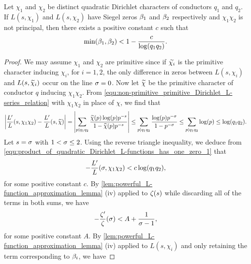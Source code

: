     \begin{proposition}\label{prop:product_of_quadratic_Dirichlet_L-functions_has_one_zero}
      Let $\chi_{1}$ and $\chi_{2}$ be distinct quadratic Dirichlet characters of conductors $q_{1}$ and $q_{2}$. If $L(s,\chi_{1})$ and $L(s,\chi_{2})$ have Siegel zeros $\beta_{1}$ and $\beta_{2}$ respectively and $\chi_{1}\chi_{2}$ is not principal, then there exists a positive constant $c$ such that
      \[
        \min(\beta_{1},\beta_{2}) < 1-\frac{c}{\log(q_{1}q_{2})}.
      \]
    \end{proposition}
    \begin{proof}
        We may assume $\chi_{1}$ and $\chi_{2}$ are primitive since if $\widetilde{\chi_{i}}$ is the primitive character inducing $\chi_{i}$, for $i = 1,2$, the only difference in zeros between $L(s,\chi_{i})$ and $L(s,\widetilde{\chi}_{i})$ occur on the line $\sigma = 0$. Now let $\widetilde{\chi}$ be the primitive character of conductor $q$ inducing $\chi_{1}\chi_{2}$. From \cref{equ:non-primitive_primitive_Dirichlet_L-series_relation} with $\chi_{1}\chi_{2}$ in place of $\chi$, we find that
        \begin{equation}\label{equ:product_of_quadratic_Dirichlet_L-functions_has_one_zero_1}
          \left|\frac{L'}{L}(s,\chi_{1}\chi_{2})-\frac{L'}{L}(s,\widetilde{\chi})\right| = \left|\sum_{p \mid q_{1}q_{2}}\frac{\widetilde{\chi}(p)\log(p)p^{-s}}{1-\widetilde{\chi}(p)p^{-s}}\right| \le \sum_{p \mid q_{1}q_{2}}\frac{\log(p)p^{-\sigma}}{1-p^{-\sigma}} \le \sum_{p \mid q_{1}q_{2}}\log(p) \le \log(q_{1}q_{2}).
        \end{equation}
        Let $s = \sigma$ with $1 < \sigma \le 2$. Using the reverse triangle inequality, we deduce from \cref{equ:product_of_quadratic_Dirichlet_L-functions_has_one_zero_1} that
        \begin{equation}\label{equ:product_of_quadratic_Dirichlet_L-functions_has_one_zero_2}
          -\frac{L'}{L}(\sigma,\chi_{1}\chi_{2}) < c\log(q_{1}q_{2}),
        \end{equation}
        for some positive constant $c$.
        By \cref{lem:powerful_L-function_approximation_lemma} (iv) applied to $\zeta(s)$ while discarding all of the terms in both sums, we have
        \begin{equation}\label{equ:product_of_quadratic_Dirichlet_L-functions_has_one_zero_3}
          -\frac{\zeta'}{\zeta}(\sigma) < A+\frac{1}{\sigma-1},
        \end{equation}
        for some positive constant $A$. By \cref{lem:powerful_L-function_approximation_lemma} (iv) applied to $L(s,\chi_{i})$ and only retaining the term corresponding to $\beta_{i}$, we have

\end{proof}
